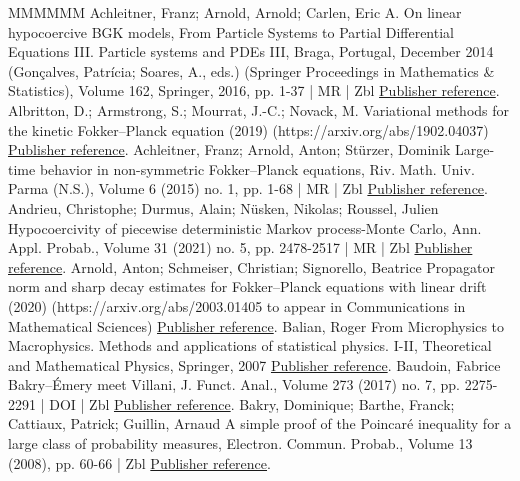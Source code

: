 \documentclass[10pt,a4paper]{article}
\numberwithin{equation}{section}
\begin{document}
\begin{thebibliography}{MMMMMM}
 Achleitner, Franz; Arnold, Arnold; Carlen, Eric A. On linear hypocoercive BGK models, From Particle Systems to Partial Differential Equations III. Particle systems and PDEs III, Braga, Portugal, December 2014 (Gonçalves, Patrícia; Soares, A., eds.) (Springer Proceedings in Mathematics \& Statistics), Volume 162, Springer, 2016, pp. 1-37 | MR | Zbl \href{https://ahl.centre-mersenne.org/item/AHL_2022__5__523_0/#AAC16}{Publisher reference}.
 Albritton, D.; Armstrong, S.; Mourrat, J.-C.; Novack, M. Variational methods for the kinetic Fokker–Planck equation (2019) (https://arxiv.org/abs/1902.04037) \href{https://ahl.centre-mersenne.org/item/AHL_2022__5__523_0/#AM19}{Publisher reference}.
 Achleitner, Franz; Arnold, Anton; Stürzer, Dominik Large-time behavior in non-symmetric Fokker–Planck equations, Riv. Math. Univ. Parma (N.S.), Volume 6 (2015) no. 1, pp. 1-68 | MR | Zbl \href{https://ahl.centre-mersenne.org/item/AHL_2022__5__523_0/#AAS15}{Publisher reference}.
 Andrieu, Christophe; Durmus, Alain; Nüsken, Nikolas; Roussel, Julien Hypocoercivity of piecewise deterministic Markov process-Monte Carlo, Ann. Appl. Probab., Volume 31 (2021) no. 5, pp. 2478-2517 | MR | Zbl \href{https://ahl.centre-mersenne.org/item/AHL_2022__5__523_0/#ADNR18}{Publisher reference}.
 Arnold, Anton; Schmeiser, Christian; Signorello, Beatrice Propagator norm and sharp decay estimates for Fokker–Planck equations with linear drift (2020) (https://arxiv.org/abs/2003.01405 to appear in Communications in Mathematical Sciences) \href{https://ahl.centre-mersenne.org/item/AHL_2022__5__523_0/#ASS20}{Publisher reference}.
 Balian, Roger From Microphysics to Macrophysics. Methods and applications of statistical physics. I-II, Theoretical and Mathematical Physics, Springer, 2007 \href{https://ahl.centre-mersenne.org/item/AHL_2022__5__523_0/#Balian}{Publisher reference}.
 Baudoin, Fabrice Bakry–Émery meet Villani, J. Funct. Anal., Volume 273 (2017) no. 7, pp. 2275-2291 | DOI | Zbl \href{https://ahl.centre-mersenne.org/item/AHL_2022__5__523_0/#Baudoin17}{Publisher reference}.
 Bakry, Dominique; Barthe, Franck; Cattiaux, Patrick; Guillin, Arnaud A simple proof of the Poincaré inequality for a large class of probability measures, Electron. Commun. Probab., Volume 13 (2008), pp. 60-66 | Zbl \href{https://ahl.centre-mersenne.org/item/AHL_2022__5__523_0/#BBCG}{Publisher reference}.

\end{thebibliography}
\end{document}
